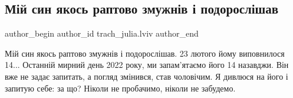  
 
 
 
 
 
\subsection{Мій син якось раптово змужнів і подорослішав}
\label{sec:22_04_2022.fb.trach_julia.lviv.1.mij_syn}
 
\ifcmt
 author_begin
   author_id trach_julia.lviv
 author_end
\fi

Мій син якось раптово змужнів і подорослішав. 23 лютого йому виповнилося 14...
Останній мирний день 2022 року, ми запам'ятаємо його 14 назавджи. Він вже не
задає запитать, а погляд змінився, став чоловічим. Я дивлюся на його і запитую
себе: за що?  Ніколи не пробачимо, ніколи не забудемо.

